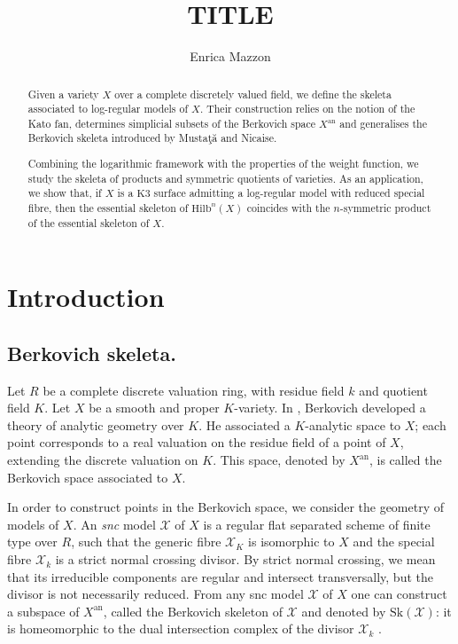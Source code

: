 \documentclass{amsart}%
\title{TITLE}
\author{Enrica Mazzon}
\date{}
\numberwithin{equation}{subsection}
\theoremstyle{plain2}
\theoremstyle{definition2}
\theoremstyle{stepstyle}
\theoremstyle{point}
\theoremstyle{subpoint}
\newcommand{\cX}{\ensuremath{\mathscr{X}}}
\newcommand{\Hilb}{\ensuremath{\mathrm{Hilb}}}
\newcommand{\an}{\mathrm{an}}
\newcommand{\Sk}{\mathrm{Sk}}
\begin{document}
\maketitle
\begin{abstract}
Given a variety $X$ over a complete discretely valued field, we define the skeleta associated to log-regular models of $X$. Their construction relies on the notion of the Kato fan, determines simplicial subsets of the Berkovich space $X^\an$ and generalises the Berkovich skeleta introduced by Musta\c{t}\u{a} and Nicaise.

Combining the logarithmic framework with the properties of the weight function, we study the skeleta of products and symmetric quotients of varieties. As an application, we show that, if $X$ is a $\text{K}3$ surface admitting a log-regular model with reduced special fibre, then the essential skeleton of $\Hilb^n(X)$ coincides with the $n$-symmetric product of the essential skeleton of $X$.
\end{abstract}


\section{Introduction}

\subsection{Berkovich skeleta.} Let $R$ be a complete discrete valuation ring, with residue field $k$ and quotient field $K$. Let $X$ be a smooth and proper $K$-variety. In \cite{Berkovich1990}, Berkovich developed a theory of analytic geometry over $K$. He associated a $K$-analytic space to $X$; each point corresponds to a real valuation on the residue field of a point of $X$, extending the discrete valuation on $K$. This space, denoted by $X^\an$, is called the Berkovich space associated to $X$.

In order to construct points in the Berkovich space, we consider the geometry of models of $X$. An \textit{snc} model $\cX$ of $X$ is a regular flat separated scheme of finite type over $R$, such that the generic fibre $\cX_K$ is isomorphic to $X$ and the special fibre $\cX_k$ is a strict normal crossing divisor. By strict normal crossing, we mean that its irreducible components are regular and intersect transversally, but the divisor is not necessarily reduced. From any snc model $\cX$ of $X$ one can construct a subspace of $X^\an$, called the Berkovich skeleton of $\cX$ and denoted by $\Sk(\cX)$: it is homeomorphic to the dual intersection complex of the divisor $\cX_k$ \cite{MustataNicaise}.
\end{document}
